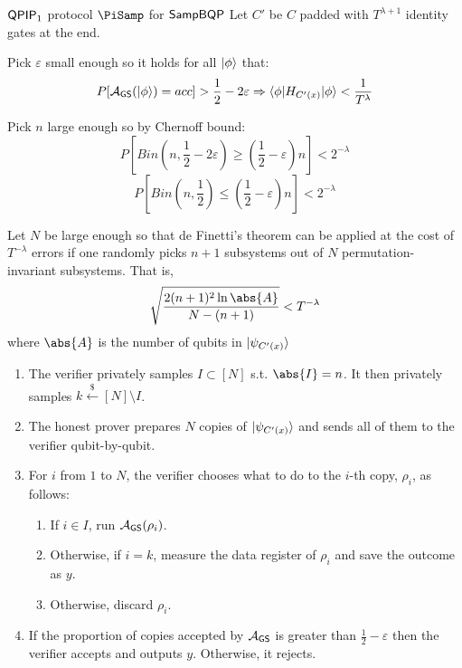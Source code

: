 \begin{protocol}{$\operatorname{\mathsf{QPIP}}_1$ protocol $\PiSamp$ for $\operatorname{\mathsf{SampBQP}}$}\label{ProtoQPIP1}
	Let $C'$ be $C$ padded with $T^{\lambda + 1}$ identity gates at the end.

	Pick $\varepsilon$ small enough so it holds for all $\ket\phi$ that:
	\begin{equation}
		\label{QPIP1eps}
		P[\mathcal{A}_{\mathsf{GS}}(\ket{\phi})=acc]>\frac{1}{2}-2\varepsilon\Rightarrow\braket{\phi|H_{C'(x)}|\phi}<\frac{1}{T^\lambda}
	\end{equation}

	Pick $n$ large enough so by Chernoff bound:
	\begin{equation}
		\label{QPIP1Chernoff1}
		P\left[Bin(n, \frac{1}{2}-2\varepsilon)\geq\left(\frac{1}{2}-\varepsilon\right)n\right]<2^{-\lambda}
	\end{equation}
	\begin{equation}
		\label{QPIP1Chernoff2}
		P\left[Bin(n, \frac{1}{2})\leq\left(\frac{1}{2}-\varepsilon\right)n\right]<2^{-\lambda}
	\end{equation}

	Let $N$ be large enough so that de Finetti's theorem can be applied at the cost of $T^{-\lambda}$ errors if one randomly picks $n+1$ subsystems out of $N$ permutation-invariant subsystems.
		That is,
		$$\sqrt{\frac{2(n+1)^2\ln\abs{A}}{N-(n+1)}}<T^{-\lambda}$$
		where $\abs{A}$ is the number of qubits in $\ket{\psi_{C'(x)}}$

	\begin{enumerate}
		\item The verifier privately samples $I\subset[N]$ s.t. $\abs{I}=n$.
			It then privately samples $k\xleftarrow{\$}[N]\setminus I$.
		\item The honest prover prepares $N$ copies of $\ket{\psi_{C'(x)}}$ and sends all of them to the verifier qubit-by-qubit.
		\item For $i$ from $1$ to $N$, the verifier chooses what to do to the $i$-th copy, $\rho_i$, as follows:
		\begin{enumerate}
			\item If $i\in I$, run $\mathcal{A}_{\mathsf{GS}}(\rho_i)$.
			\item Otherwise, if $i=k$, measure the data register of $\rho_i$ and save the outcome as $y$.
			\item Otherwise, discard $\rho_i$.
		\end{enumerate}
		\item If the proportion of copies accepted by $\mathcal{A}_{\mathsf{GS}}$ is greater than $\frac{1}{2}-\varepsilon$ then the verifier accepts and outputs $y$. Otherwise, it rejects.
	\end{enumerate}
\end{protocol}

